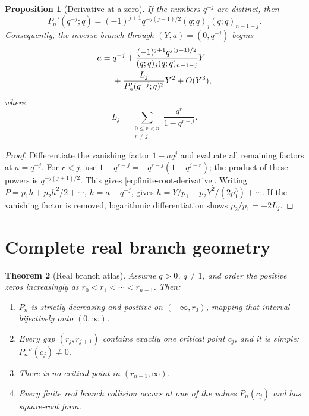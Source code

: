 \documentclass[11pt,a4paper,oneside,openany]{book}
\newtheorem{theorem}{Theorem}[chapter]
\newtheorem{proposition}[theorem]{Proposition}
\theoremstyle{definition}
\theoremstyle{remark}
\begin{document}
\begin{proposition}[Derivative at a zero]\label{prop:finite-root-derivative}
If the numbers \(q^{-j}\) are distinct, then
\begin{equation}\label{eq:finite-root-derivative}
 P_n'(q^{-j};q)=(-1)^{j+1}q^{-j(j-1)/2}(q;q)_j(q;q)_{n-1-j}.
\end{equation}
Consequently, the inverse branch through \((Y,a)=(0,q^{-j})\) begins
\begin{align}
 a={}&q^{-j}
 +\frac{(-1)^{j+1}q^{j(j-1)/2}}{(q;q)_j(q;q)_{n-1-j}}Y\notag\\
 &+\frac{L_j}{P_n'(q^{-j};q)^2}Y^2+O(Y^3),
\label{eq:finite-root-inverse}
\end{align}
where
\[
 L_j=\sum_{\substack{0\le r<n\\r\ne j}}
 \frac{q^r}{1-q^{r-j}}.
\]
\end{proposition}

\begin{proof}
Differentiate the vanishing factor \(1-aq^j\) and evaluate all remaining
factors at \(a=q^{-j}\).  For \(r<j\), use
\(1-q^{r-j}=-q^{r-j}(1-q^{j-r})\); the product of these powers is
\(q^{-j(j+1)/2}\).  This gives \eqref{eq:finite-root-derivative}.
Writing \(P=p_1h+p_2h^2/2+\cdots\), \(h=a-q^{-j}\), gives
\(h=Y/p_1-p_2Y^2/(2p_1^3)+\cdots\).  If the vanishing factor is removed,
logarithmic differentiation shows \(p_2/p_1=-2L_j\).
\end{proof}

\section{Complete real branch geometry}\label{sec:real-a-geometry}

\begin{theorem}[Real branch atlas]\label{thm:real-a-atlas}
Assume \(q>0\), \(q\ne1\), and order the positive zeros increasingly as
\(r_0<r_1<\cdots<r_{n-1}\).  Then:
\begin{enumerate}[label=\textup{(\roman*)}]
\item \(P_n\) is strictly decreasing and positive on \(( -\infty,r_0)\),
      mapping that interval bijectively onto \((0,\infty)\).
\item Every gap \((r_j,r_{j+1})\) contains exactly one critical point
      \(c_j\), and it is simple: \(P_n''(c_j)\ne0\).
\item There is no critical point in \((r_{n-1},\infty)\).
\item Every finite real branch collision occurs at one of the values
      \(P_n(c_j)\) and has square-root form.
\end{enumerate}
\end{theorem}
\end{document}
